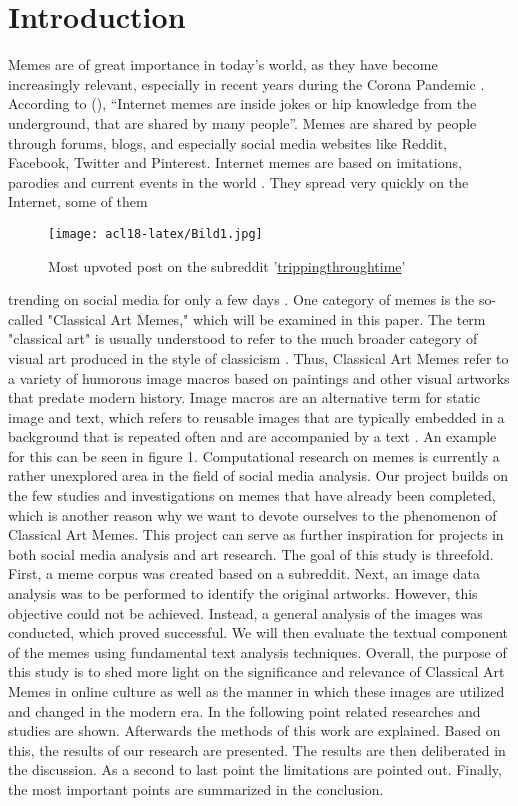 \documentclass[11pt,a4paper]{article}
\begin{document}
\section{Introduction}
Memes are of great importance in today's world, as they have become increasingly relevant, especially in recent years during the Corona Pandemic \cite{Barnes2021}. According to \citeauthor{Bauckhage2021} (\citeyear{Bauckhage2021}), “Internet memes are inside jokes or hip knowledge from the underground, that are shared by many people”.
Memes are shared by people through forums,
blogs, and especially social media websites like
Reddit, Facebook, Twitter and Pinterest. Internet
memes are based on imitations, parodies and
current events in the world \cite{Bauckhage2021}.
They spread very quickly on the Internet, some of
them
\begin{figure}[H]
    \centering
    \texttt{[image: acl18-latex/Bild1.jpg]}
    \caption{Most upvoted post on the subreddit '\hyperlink{https://www.reddit.com/r/trippinthroughtime/}{trippingthroughtime}'}
    \label{fig:my_label}
\end{figure}
trending on social media for only a few days \cite{Barnes2021}. One category of memes is the so-called "Classical Art Memes," which will be examined in this paper. The term "classical art" is usually understood to refer to the much broader category of visual art produced in the style of classicism \cite{Lanci2022}. Thus, Classical Art Memes refer to a variety of humorous image macros based on paintings and other visual artworks that predate modern history. Image macros are an alternative term for static image and text, which refers to reusable images that are typically embedded in a background that is repeated often and are accompanied by a text \cite{Laineste2017}. An example for this can be seen in figure 1.
Computational research on memes is currently a rather unexplored area in the field of social media analysis. Our project builds on the few studies and investigations on memes that have already been completed, which is another reason why we want to devote ourselves to the phenomenon of Classical Art Memes. This project can serve as further inspiration for projects in both social media analysis and art research. 
The goal of this study is threefold. First, a meme corpus was created based on a subreddit. Next, an image data analysis was to be performed to identify the original artworks. However, this objective could not be achieved. Instead, a general analysis of the images was conducted, which proved successful. We will then evaluate the textual component of the memes using fundamental text analysis techniques. Overall, the purpose of this study is to shed more light on the significance and relevance of Classical Art Memes in online culture as well as the manner in which these images are utilized and changed in the modern era. In the following point related researches and studies are shown. Afterwards the methods of this work are explained. Based on this, the results of our research are presented. The results are then deliberated in the discussion. As a second to last point the limitations are pointed out. Finally, the most important points
are summarized in the conclusion.
\end{document}
